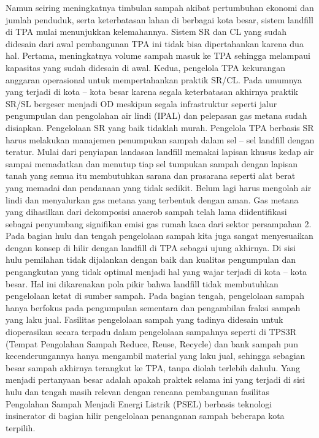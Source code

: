 \documentclass[
  letterpaper,
  DIV=11,
  numbers=noendperiod]{scrreprt}
\begin{document}
Namun seiring meningkatnya timbulan sampah akibat pertumbuhan ekonomi
dan jumlah penduduk, serta keterbatasan lahan di berbagai kota besar,
sistem landfill di TPA mulai menunjukkan kelemahannya. Sistem SR dan CL
yang sudah didesain dari awal pembangunan TPA ini tidak bisa
dipertahankan karena dua hal. Pertama, meningkatnya volume sampah masuk
ke TPA sehingga melampaui kapasitas yang sudah didesain di awal. Kedua,
pengelola TPA kekurangan anggaran operasional untuk mempertahankan
praktik SR/CL. Pada umumnya yang terjadi di kota -- kota besar karena
segala keterbatasan akhirnya praktik SR/SL bergeser menjadi OD meskipun
segala infrastruktur seperti jalur pengumpulan dan pengolahan air lindi
(IPAL) dan pelepasan gas metana sudah disiapkan. Pengelolaan SR yang
baik tidaklah murah. Pengelola TPA berbasis SR harus melakukan manajemen
penumpukan sampah dalam sel -- sel landfill dengan teratur. Mulai dari
penyiapan landasan landfill memakai lapisan khusus kedap air sampai
memadatkan dan menutup tiap sel tumpukan sampah dengan lapisan tanah
yang semua itu membutuhkan sarana dan prasarana seperti alat berat yang
memadai dan pendanaan yang tidak sedikit. Belum lagi harus mengolah air
lindi dan menyalurkan gas metana yang terbentuk dengan aman. Gas metana
yang dihasilkan dari dekomposisi anaerob sampah telah lama
diidentifikasi sebagai penyumbang signifikan emisi gas rumah kaca dari
sektor persampahan 2. Pada bagian hulu dan tengah pengelolaan sampah
kita juga sangat menyesuaikan dengan konsep di hilir dengan landfill di
TPA sebagai ujung akhirnya. Di sisi hulu pemilahan tidak dijalankan
dengan baik dan kualitas pengumpulan dan pengangkutan yang tidak optimal
menjadi hal yang wajar terjadi di kota -- kota besar. Hal ini
dikarenakan pola pikir bahwa landfill tidak membutuhkan pengelolaan
ketat di sumber sampah. Pada bagian tengah, pengelolaan sampah hanya
berfokus pada pengumpulan sementara dan pengambilan fraksi sampah yang
laku jual. Fasilitas pengelolaan sampah yang tadinya didesain untuk
dioperasikan secara terpadu dalam pengelolaan sampahnya seperti di TPS3R
(Tempat Pengolahan Sampah Reduce, Reuse, Recycle) dan bank sampah pun
kecenderungannya hanya mengambil material yang laku jual, sehingga
sebagian besar sampah akhirnya terangkut ke TPA, tanpa diolah terlebih
dahulu. Yang menjadi pertanyaan besar adalah apakah praktek selama ini
yang terjadi di sisi hulu dan tengah masih relevan dengan rencana
pembangunan fasilitas Pengolahan Sampah Menjadi Energi Listrik (PSEL)
berbasis teknologi insinerator di bagian hilir pengelolaan penanganan
sampah beberapa kota terpilih.\\
\end{document}
